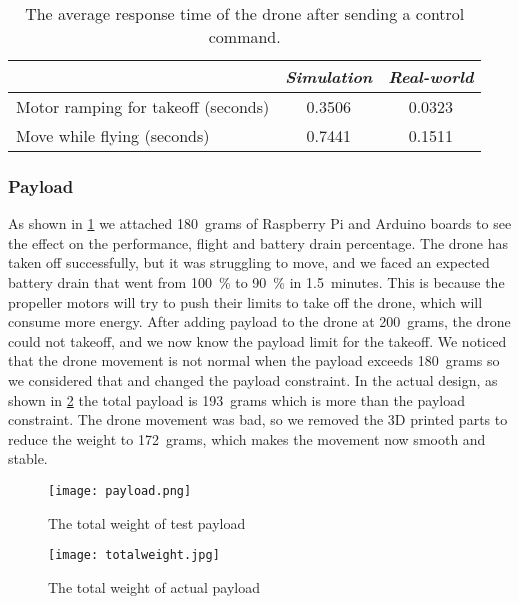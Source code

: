 \documentclass[../main.tex]{subfiles}
\begin{document}
\begin{table}[H]
	\centering
	\caption{The average response time of the drone after sending a control command.}
	\label{tab:respone-time}
	\begin{tabularx}{0.7\textwidth}{ X c c }
		\toprule
		\textit{} & \textit{Simulation} & \textit{Real-world}\\ \midrule
		Motor ramping for takeoff (seconds)  & 0.3506 & 0.0323     \\
		Move while flying (seconds) & 0.7441  & 0.1511   \\
		\bottomrule
	\end{tabularx}
\end{table} 

\subsubsection{Payload}

As shown in \cref{fig:payload}
we attached \SI{180}{grams} of Raspberry Pi and Arduino boards
to see the effect on the performance, flight and
battery drain percentage. 
The drone has taken off successfully, 
but it was struggling to move, and we faced an expected 
battery drain that went from 
\SI{100}{\percent} to \SI{90}{\percent} in 
\SI{1.5}{minutes}. This is because the propeller motors will try to push 
their limits to take off the drone, which will consume more energy.
After adding payload to the drone at \SI{200}{grams}, the drone could not
takeoff, and we now know the payload limit for the takeoff. We noticed that the drone movement
is not normal when the payload exceeds \SI{180}{grams} so we considered that and changed
the payload constraint. In the actual design, as shown in 
\cref{fig:actual-total-weight} the total payload 
is \SI{193}{grams} which is more than the payload constraint. The drone movement was bad, so we removed the 3D printed
parts to reduce the weight to \SI{172}{grams}, which makes the movement now smooth and 
stable.



\begin{figure}[H]
	\centering
	\texttt{[image: payload.png]}
	\caption{The total weight of test payload}
	\label{fig:payload}
\end{figure} 

\begin{figure}[H]
	\centering
	\texttt{[image: totalweight.jpg]}
	\caption{The total weight of actual payload}
	\label{fig:actual-total-weight}
\end{figure} 
\end{document}
